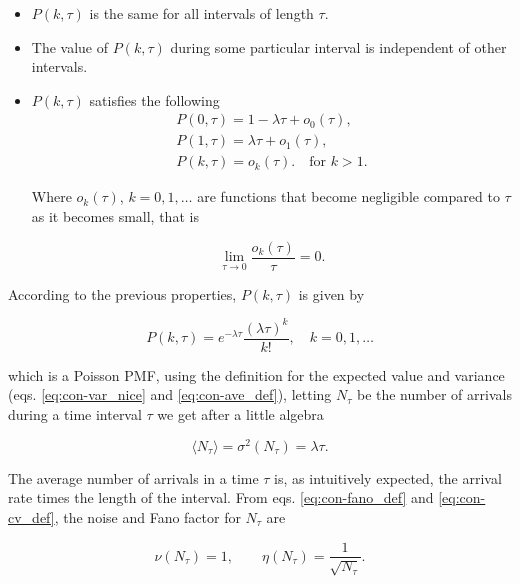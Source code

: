 \begin{itemize}
  \item  $P(k,\tau)$ is the same for all intervals of length $\tau$.
  \item  The value of $P(k,\tau)$ during some particular interval is independent of other intervals.
  \item $P(k,\tau)$ satisfies the following
    \begin{equation*}
      \begin{split}
        P(0,\tau)=1-\lambda\tau+o_0(\tau),\\
        P(1,\tau)=\lambda\tau+o_1(\tau),\\
        P(k,\tau)=o_k(\tau).\quad\text{for } k>1.
      \end{split}
    \end{equation*}
    
    Where $o_k(\tau)$, $k=0,1,\dotsc$ are functions that become negligible compared to $\tau$ as it becomes small, that is

    \begin{equation*}
      \lim_{\tau\to 0}\frac{o_k(\tau)}{\tau}=0.
    \end{equation*}
\end{itemize}

According to the previous properties, $P(k,\tau)$ is given by

\begin{equation*}
  P(k,\tau) = e^{-\lambda\tau}\frac{(\lambda\tau)^k}{k!},\quad k=0,1,\dotsc
\end{equation*}

which is a Poisson PMF, using the definition for the expected value and variance (eqs. \eqref{eq:con-var_nice} and \eqref{eq:con-ave_def}), letting $N_\tau$ be the number of arrivals during a time interval $\tau$  we get after a little algebra

\begin{equation*}
  \langle N_\tau\rangle = \sigma^2(N_\tau) = \lambda \tau.
\end{equation*}

The average number of arrivals in a time $\tau$ is, as intuitively expected, the arrival rate times the length of the interval. From eqs. \eqref{eq:con-fano_def} and \eqref{eq:con-cv_def}, the noise and Fano factor for $N_\tau$ are

\begin{equation}
  \label{eq:con-poisson_noise}
  \nu(N_\tau) = 1,\quad\quad \eta(N_\tau) = \frac{1}{\sqrt{N_\tau}}.
\end{equation}

